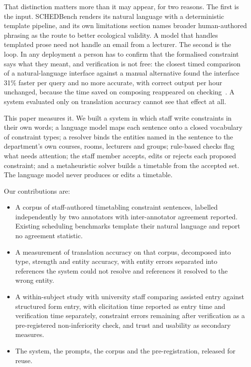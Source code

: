 \documentclass[acmsmall,screen,review,anonymous]{acmart}
\begin{document}
That distinction matters more than it may appear, for two reasons. The first is
the input. SCHEDBench renders its natural language with a deterministic
template pipeline, and its own limitations section names broader
human-authored phrasing as the route to better ecological validity. A model
that handles templated prose need not handle an email from a lecturer. The
second is the loop. In any deployment a person has to confirm that the
formalised constraint says what they meant, and verification is not free: the
closest timed comparison of a natural-language interface against a manual
alternative found the interface 31\% faster per query and no more accurate,
with correct output per hour unchanged, because the time saved on composing
reappeared on checking~\cite{ipeirotis2026nlidb}. A system evaluated only on
translation accuracy cannot see that effect at all.

This paper measures it. We built a system in which staff write constraints in
their own words; a language model maps each sentence onto a closed vocabulary
of constraint types; a resolver binds the entities named in the sentence to
the department's own courses, rooms, lecturers and groups; rule-based checks
flag what needs attention; the staff member accepts, edits or rejects each
proposed constraint; and a metaheuristic solver builds a timetable from the
accepted set. The language model never produces or edits a timetable.

Our contributions are:

\begin{itemize}
  \item A corpus of staff-authored timetabling constraint sentences, labelled
        independently by two annotators with inter-annotator agreement
        reported. Existing scheduling benchmarks template their natural
        language and report no agreement statistic.
  \item A measurement of translation accuracy on that corpus, decomposed into
        type, strength and entity accuracy, with entity errors separated into
        references the system could not resolve and references it resolved to
        the wrong entity.
  \item A within-subject study with university staff comparing assisted entry
        against structured form entry, with elicitation time reported as entry
        time and verification time separately, constraint errors remaining
        after verification as a pre-registered non-inferiority check, and
        trust and usability as secondary measures.
  \item The system, the prompts, the corpus and the pre-registration, released
        for reuse.
\end{itemize}
\end{document}
